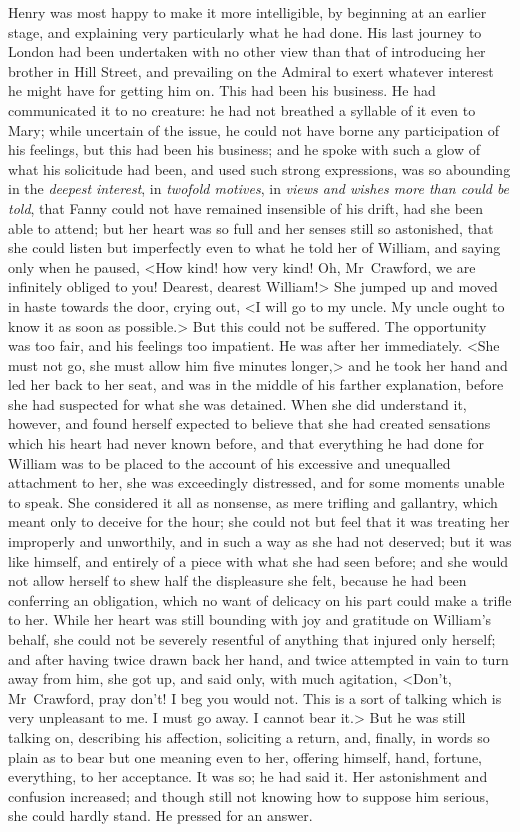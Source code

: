 Henry was most happy to make it more intelligible, by beginning at an earlier stage, and explaining very particularly what he had done. His last journey to London had been undertaken with no other view than that of introducing her brother in Hill Street, and prevailing on the Admiral to exert whatever interest he might have for getting him on. This had been his business. He had communicated it to no creature: he had not breathed a syllable of it even to Mary; while uncertain of the issue, he could not have borne any participation of his feelings, but this had been his business; and he spoke with such a glow of what his solicitude had been, and used such strong expressions, was so abounding in the \textit{deepest interest}, in \textit{twofold motives}, in \textit{views and wishes more than could be told}, that Fanny could not have remained insensible of his drift, had she been able to attend; but her heart was so full and her senses still so astonished, that she could listen but imperfectly even to what he told her of William, and saying only when he paused, <How kind! how very kind! Oh, Mr~Crawford, we are infinitely obliged to you! Dearest, dearest William!> She jumped up and moved in haste towards the door, crying out, <I will go to my uncle. My uncle ought to know it as soon as possible.> But this could not be suffered. The opportunity was too fair, and his feelings too impatient. He was after her immediately. <She must not go, she must allow him five minutes longer,> and he took her hand and led her back to her seat, and was in the middle of his farther explanation, before she had suspected for what she was detained. When she did understand it, however, and found herself expected to believe that she had created sensations which his heart had never known before, and that everything he had done for William was to be placed to the account of his excessive and unequalled attachment to her, she was exceedingly distressed, and for some moments unable to speak. She considered it all as nonsense, as mere trifling and gallantry, which meant only to deceive for the hour; she could not but feel that it was treating her improperly and unworthily, and in such a way as she had not deserved; but it was like himself, and entirely of a piece with what she had seen before; and she would not allow herself to shew half the displeasure she felt, because he had been conferring an obligation, which no want of delicacy on his part could make a trifle to her. While her heart was still bounding with joy and gratitude on William's behalf, she could not be severely resentful of anything that injured only herself; and after having twice drawn back her hand, and twice attempted in vain to turn away from him, she got up, and said only, with much agitation, <Don't, Mr~Crawford, pray don't! I beg you would not. This is a sort of talking which is very unpleasant to me. I must go away. I cannot bear it.> But he was still talking on, describing his affection, soliciting a return, and, finally, in words so plain as to bear but one meaning even to her, offering himself, hand, fortune, everything, to her acceptance. It was so; he had said it. Her astonishment and confusion increased; and though still not knowing how to suppose him serious, she could hardly stand. He pressed for an answer.

